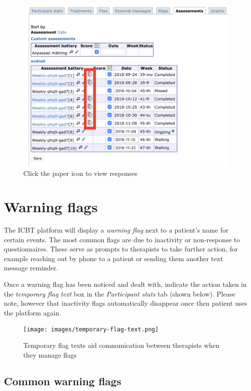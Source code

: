 \documentclass[]{book}
\theoremstyle{definition}
\theoremstyle{definition}
\theoremstyle{definition}
\theoremstyle{remark}
\begin{document}
\begin{figure}
\centering
\includegraphics{images/assessments-list.png}
\caption{Click the paper icon to view responses}
\end{figure}

\hypertarget{warning-flags}{%
\section{Warning flags}\label{warning-flags}}

The ICBT platform will display a \emph{warning flag} next to a patient's
name for certain events. The most common flags are due to inactivity or
non-response to questionnaires. These serve as prompts to therapists to
take further action, for example reaching out by phone to a patient or
sending them another text message reminder.

Once a warning flag has been noticed and dealt with, indicate the action
taken in the \emph{temporary flag text} box in the \emph{Participant
stats} tab (shown below). Please note, however that inactivity flags
automatically disappear once then patient uses the platform again.

\begin{figure}
\centering
\texttt{[image: images/temporary-flag-text.png]}
\caption{Temporary flag texts aid communication between therapists when
they manage flags}
\end{figure}

\hypertarget{common-warning-flags}{%
\subsection{Common warning flags}\label{common-warning-flags}}
\end{document}
